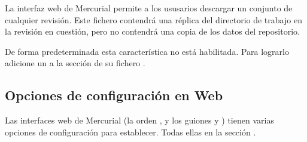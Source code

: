 La interfaz web de Mercurial permite a los ususarios descargar
un conjunto de cualquier revisión.  Este fichero contendrá una réplica
del directorio de trabajo en la revisión en cuestión, pero no
contendrá una copia de los datos del repositorio.

De forma predeterminada esta característica no está habilitada.  Para
lograrlo adicione un  a la sección 
de su fichero \hgrc.

\subsection{Opciones de configuración en Web}

Las interfaces web de Mercurial (la orden , y los guiones
 y ) tienen varias
opciones de configuración para establecer. Todas ellas en la sección
.

